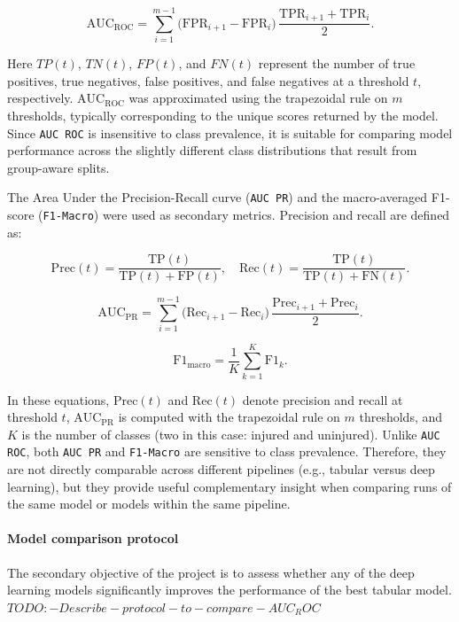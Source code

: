 \begin{equation}
    \mathrm{AUC}_{\mathrm{ROC}}
    = \sum_{i=1}^{m-1} \big(\mathrm{FPR}_{i+1}-\mathrm{FPR}_{i}\big)\,
    \frac{\mathrm{TPR}_{i+1}+\mathrm{TPR}_{i}}{2}.
\end{equation}

Here $TP(t)$, $TN(t)$, $FP(t)$, and $FN(t)$ represent the number of true positives, true negatives, false positives, and false negatives at a threshold $t$, respectively. $\mathrm{AUC}_{\mathrm{ROC}}$ was approximated using the trapezoidal rule on $m$ thresholds, typically corresponding to the unique scores returned by the model. Since \texttt{AUC ROC} is insensitive to class prevalence, it is suitable for comparing model performance across the slightly different class distributions that result from group-aware splits.  

The Area Under the Precision-Recall curve (\texttt{AUC PR}) and the macro-averaged F1-score (\texttt{F1-Macro}) were used as secondary metrics. Precision and recall are defined as:  

\begin{equation}
    \mathrm{Prec}(t)=\frac{\mathrm{TP}(t)}{\mathrm{TP}(t)+\mathrm{FP}(t)},\quad
    \mathrm{Rec}(t)=\frac{\mathrm{TP}(t)}{\mathrm{TP}(t)+\mathrm{FN}(t)}.
\end{equation}

\begin{equation}
    \mathrm{AUC}_{\mathrm{PR}}
    = \sum_{i=1}^{m-1} \big(\mathrm{Rec}_{i+1}-\mathrm{Rec}_i\big)\,\frac{\mathrm{Prec}_{i+1}+\mathrm{Prec}_i}{2}.
\end{equation}

\begin{equation}
    \mathrm{F1}_{\mathrm{macro}}=\frac{1}{K}\sum_{k=1}^{K}\mathrm{F1}_k.
\end{equation}

In these equations, $\mathrm{Prec}(t)$ and $\mathrm{Rec}(t)$ denote precision and recall at threshold $t$, $\mathrm{AUC}_{\mathrm{PR}}$ is computed with the trapezoidal rule on $m$ thresholds, and $K$ is the number of classes (two in this case: injured and uninjured). Unlike \texttt{AUC ROC}, both \texttt{AUC PR} and \texttt{F1-Macro} are sensitive to class prevalence. Therefore, they are not directly comparable across different pipelines (e.g., tabular versus deep learning), but they provide useful complementary insight when comparing runs of the same model or models within the same pipeline.

\paragraph{Model comparison protocol}
The secondary objective of the project is to assess whether any of the deep learning models significantly improves the performance of the best tabular model.
$TODO:-Describe-protocol-to-compare-AUC_ROC$
\citep{Sun2014}

